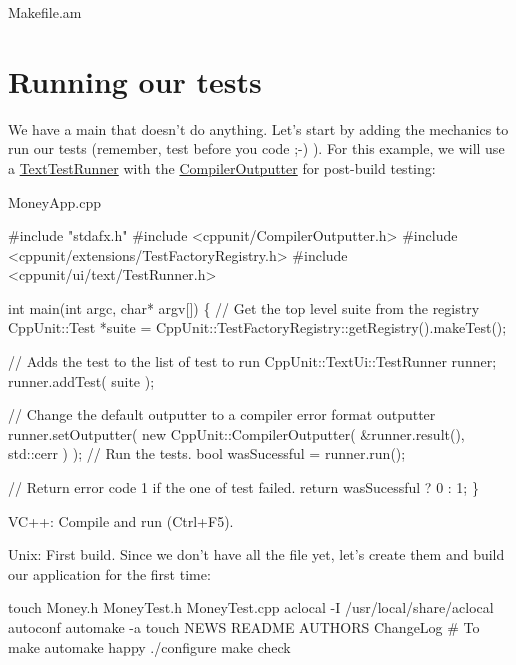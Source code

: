 {\ttfamily Makefile.\+am} 
\hypertarget{money_example_sec_running_test}{}\section{Running our tests}\label{money_example_sec_running_test}
We have a main that doesn't do anything. Let's start by adding the mechanics to run our tests (remember, test before you code ;-\/) ). For this example, we will use a \hyperlink{class_text_test_runner}{Text\+Test\+Runner} with the \hyperlink{class_compiler_outputter}{Compiler\+Outputter} for post-\/build testing\+:

{\ttfamily Money\+App.\+cpp} 
\begin{DoxyCode}
\textcolor{preprocessor}{#include "stdafx.h"}
\textcolor{preprocessor}{#include <cppunit/CompilerOutputter.h>}
\textcolor{preprocessor}{#include <cppunit/extensions/TestFactoryRegistry.h>}
\textcolor{preprocessor}{#include <cppunit/ui/text/TestRunner.h>}


\textcolor{keywordtype}{int} main(\textcolor{keywordtype}{int} argc, \textcolor{keywordtype}{char}* argv[])
\{
  \textcolor{comment}{// Get the top level suite from the registry}
  CppUnit::Test *suite = CppUnit::TestFactoryRegistry::getRegistry().makeTest();

  \textcolor{comment}{// Adds the test to the list of test to run}
  CppUnit::TextUi::TestRunner runner;
  runner.addTest( suite );

  \textcolor{comment}{// Change the default outputter to a compiler error format outputter}
  runner.setOutputter( \textcolor{keyword}{new} CppUnit::CompilerOutputter( &runner.result(),
                                                       std::cerr ) );
  \textcolor{comment}{// Run the tests.}
  \textcolor{keywordtype}{bool} wasSucessful = runner.run();

  \textcolor{comment}{// Return error code 1 if the one of test failed.}
  \textcolor{keywordflow}{return} wasSucessful ? 0 : 1;
\}
\end{DoxyCode}


V\+C++\+: Compile and run (Ctrl+\+F5).

Unix\+: First build. Since we don't have all the file yet, let's create them and build our application for the first time\+: \begin{DoxyVerb}touch Money.h MoneyTest.h MoneyTest.cpp
aclocal -I /usr/local/share/aclocal
autoconf
automake -a
touch NEWS README AUTHORS ChangeLog # To make automake happy
./configure
make check\end{DoxyVerb}


